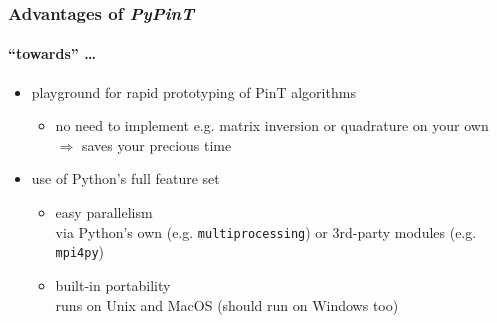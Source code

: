 \documentclass[%
  english,
  hyperref={pdfpagelabels=false},
  aspectratio=1610]{beamer}
\begin{document}
\begin{frame}
  \frametitle{Advantages of \emph{PyPinT}}
  \framesubtitle{\normalfont``towards'' \dots}
  
  \begin{itemize}
    \item playground for rapid prototyping of PinT algorithms
      \begin{itemize}\scriptsize
        \item no need to implement e.g. matrix inversion or quadrature on your own\\
          {\color{fzjgray50}\scriptsize $\Rightarrow$ saves your precious time}\\[1em]
      \end{itemize}
    \item use of Python's full feature set
      \begin{itemize}\scriptsize
        \item easy parallelism\\
          {\color{fzjgray80} via Python's own (e.g. \texttt{multiprocessing}) or 3rd-party modules (e.g. \texttt{mpi4py})}\\[.75em]
        \item built-in portability\\
          {\color{fzjgray80} runs on Unix and MacOS (should run on Windows too)}
      \end{itemize}
  \end{itemize}
\end{frame}
\end{document}
